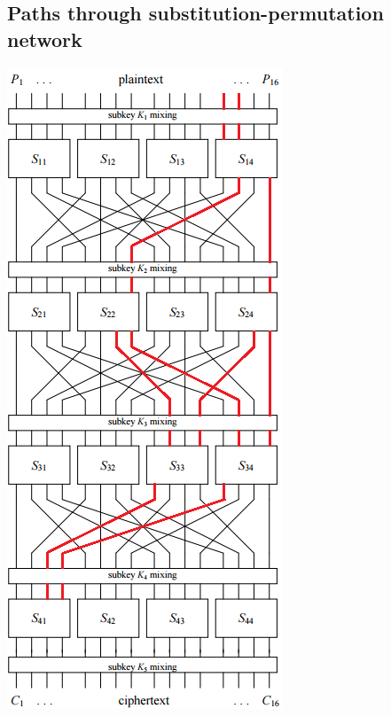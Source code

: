 \documentclass[british,10pt,a4paper]{article}
\begin{document}
\begin{appendices}
  \section{Paths through substitution-permutation network}\label{app:paths}
  \includegraphics{12,12288}

\end{appendices}
\end{document}
